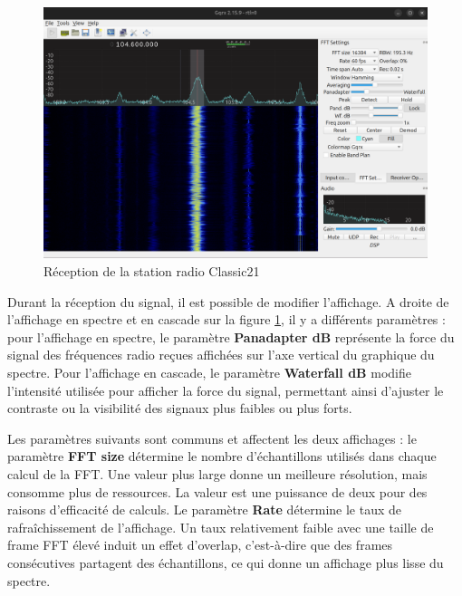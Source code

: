 \newpage

\begin{figure}[h]
\centering

\includegraphics[scale=0.18]{images/gqrx1.png}
\caption{Réception de la station radio Classic21}\label{term38}
\end{figure}

Durant la réception du signal, il est possible de modifier l'affichage. A droite de l'affichage en spectre et en cascade sur la figure \ref{term38}, il y a différents paramètres : pour l'affichage en spectre, le paramètre \textbf{Panadapter dB} représente la force du signal des fréquences radio reçues affichées sur l'axe vertical du graphique du spectre. Pour l'affichage en cascade, le paramètre \textbf{Waterfall dB} modifie l'intensité utilisée pour afficher la force du signal, permettant ainsi d'ajuster le contraste ou la visibilité des signaux plus faibles ou plus forts. 

\vspace{0.1cm}

Les paramètres suivants sont communs et affectent les deux affichages : le paramètre \textbf{FFT size} détermine le nombre d'échantillons utilisés dans chaque calcul de la \ac{FFT}. Une valeur plus large donne un meilleure résolution, mais consomme plus de ressources. La valeur est une puissance de deux pour des raisons d'efficacité de calculs. Le paramètre \textbf{Rate} détermine le taux de rafraîchissement de l'affichage. Un taux relativement faible avec une taille de frame \ac{FFT} élevé induit un effet d'overlap, c'est-à-dire que des frames consécutives partagent des échantillons, ce qui donne un affichage plus lisse du spectre.

\newpage

